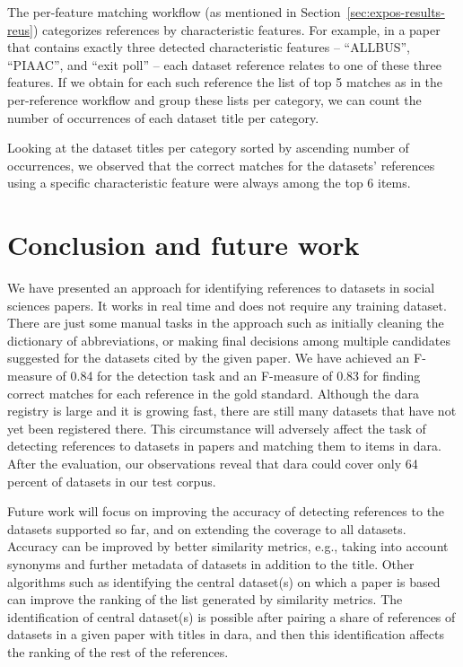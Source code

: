 \documentclass{IOS-Book-Article}
\newcommand{\dara}{\textsf{da\textbar ra}}
\begin{document}
The per-feature matching workflow (as mentioned in Section~\ref{sec:expos-results-reus}) categorizes references by characteristic features.
For example, in a paper that contains exactly three detected characteristic features -- \enquote{ALLBUS}, \enquote{PIAAC}, and \enquote{exit poll} -- each dataset reference relates to one of these three features.
If we obtain for each such reference the list of top 5 matches as in the per-reference workflow and group these lists per category, we can count the number of occurrences of each dataset title per category. 
 
Looking at the dataset titles per category sorted by ascending number of occurrences, we observed that the correct matches for the datasets' references using a specific characteristic feature were always among the top 6 items. %
 
\section{Conclusion and future work}
\label{sec:future}
We have presented an approach for identifying references to datasets in social sciences papers.
It works in real time and does not require any training dataset.
There are just some manual tasks in the approach such as initially cleaning the dictionary of abbreviations, or making final decisions among multiple candidates suggested for the datasets cited by the given paper.
We have achieved an F-measure of 0.84 for the detection task and an F-measure of 0.83 for finding correct matches for each reference in the gold standard.  
Although the {\dara} registry is large and it is growing fast, there are still many datasets that have not yet been registered there. 
This circumstance will adversely affect the task of detecting references to datasets in papers and matching them to items in {\dara}.
After the evaluation, our observations reveal that {\dara} could cover only 64 percent of datasets in our test corpus. 

Future work will focus on improving the accuracy of detecting references to the datasets supported so far, and on extending the coverage to all datasets.
Accuracy can be improved by better similarity metrics, e.g., taking into account synonyms and further metadata of datasets in addition to the title.
Other algorithms such as identifying the central dataset(s) on which a paper is based can improve the ranking of the list generated by similarity metrics.
The identification of central dataset(s) is possible after pairing a share of references of datasets in a given paper with titles in {\dara}, and then this identification affects the ranking of the rest of the references. 
\end{document}
